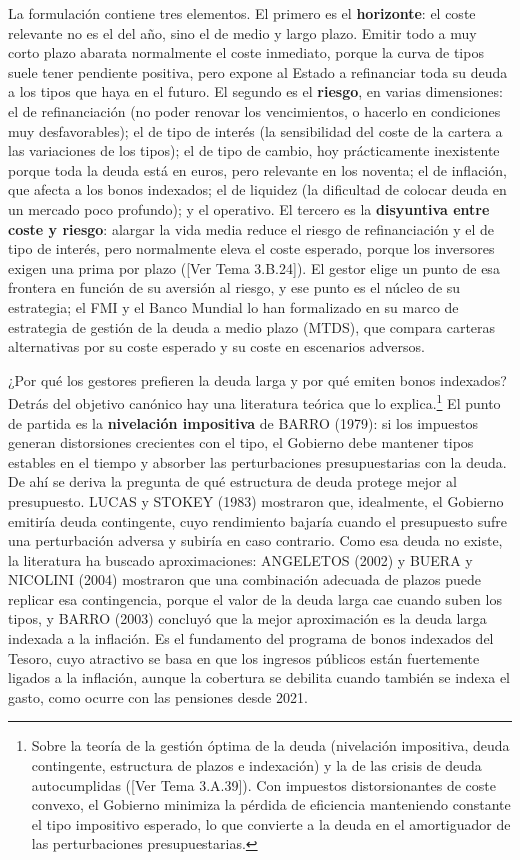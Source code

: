 \documentclass[10pt,a4paper]{article}
\newcommand{\authorfont}[1]{{\fontfamily{EBGaramond-TLF}\selectfont #1}}
\begin{document}
La formulación contiene tres elementos. El primero es el \textbf{horizonte}: el coste relevante no es el del año, sino el de medio y largo plazo. Emitir todo a muy corto plazo abarata normalmente el coste inmediato, porque la curva de tipos suele tener pendiente positiva, pero expone al Estado a refinanciar toda su deuda a los tipos que haya en el futuro. El segundo es el \textbf{riesgo}, en varias dimensiones: el de refinanciación (no poder renovar los vencimientos, o hacerlo en condiciones muy desfavorables); el de tipo de interés (la sensibilidad del coste de la cartera a las variaciones de los tipos); el de tipo de cambio, hoy prácticamente inexistente porque toda la deuda está en euros, pero relevante en los noventa; el de inflación, que afecta a los bonos indexados; el de liquidez (la dificultad de colocar deuda en un mercado poco profundo); y el operativo. El tercero es la \textbf{disyuntiva entre coste y riesgo}: alargar la vida media reduce el riesgo de refinanciación y el de tipo de interés, pero normalmente eleva el coste esperado, porque los inversores exigen una prima por plazo ([\authorfont{Ver Tema 3.B.24}]). El gestor elige un punto de esa frontera en función de su aversión al riesgo, y ese punto es el núcleo de su estrategia; el FMI y el Banco Mundial lo han formalizado en su marco de estrategia de gestión de la deuda a medio plazo (MTDS), que compara carteras alternativas por su coste esperado y su coste en escenarios adversos.

¿Por qué los gestores prefieren la deuda larga y por qué emiten bonos indexados? Detrás del objetivo canónico hay una literatura teórica que lo explica.\footnote{%
    Sobre la teoría de la gestión óptima de la deuda (nivelación impositiva, deuda contingente, estructura de plazos e indexación) y la de las crisis de deuda autocumplidas ([\authorfont{Ver Tema 3.A.39}]). Con impuestos distorsionantes de coste convexo, el Gobierno minimiza la pérdida de eficiencia manteniendo constante el tipo impositivo esperado, lo que convierte a la deuda en el amortiguador de las perturbaciones presupuestarias.
} El punto de partida es la \textbf{nivelación impositiva} de BARRO (1979): si los impuestos generan distorsiones crecientes con el tipo, el Gobierno debe mantener tipos estables en el tiempo y absorber las perturbaciones presupuestarias con la deuda. De ahí se deriva la pregunta de qué estructura de deuda protege mejor al presupuesto. LUCAS y STOKEY (1983) mostraron que, idealmente, el Gobierno emitiría deuda contingente, cuyo rendimiento bajaría cuando el presupuesto sufre una perturbación adversa y subiría en caso contrario. Como esa deuda no existe, la literatura ha buscado aproximaciones: ANGELETOS (2002) y BUERA y NICOLINI (2004) mostraron que una combinación adecuada de plazos puede replicar esa contingencia, porque el valor de la deuda larga cae cuando suben los tipos, y BARRO (2003) concluyó que la mejor aproximación es la deuda larga indexada a la inflación. Es el fundamento del programa de bonos indexados del Tesoro, cuyo atractivo se basa en que los ingresos públicos están fuertemente ligados a la inflación, aunque la cobertura se debilita cuando también se indexa el gasto, como ocurre con las pensiones desde 2021.
\end{document}
